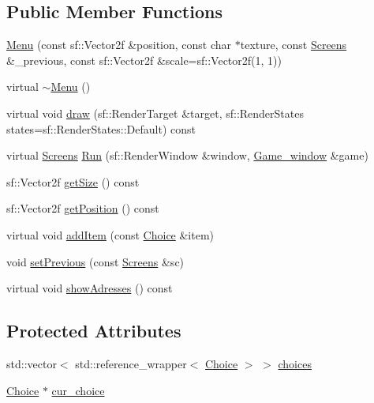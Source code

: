 \subsection*{Public Member Functions}
\begin{DoxyCompactItemize}
\item 
\hyperlink{class_menu_a0e8556179fdcc650e7f3aa58b05f9f4f}{Menu} (const sf\+::\+Vector2f \&position, const char $\ast$texture, const \hyperlink{_globals_8h_a3d5776bab98402b03be09156bacf4f68}{Screens} \&\+\_\+previous, const sf\+::\+Vector2f \&scale=sf\+::\+Vector2f(1, 1))
\item 
virtual \hyperlink{class_menu_a831387f51358cfb88cd018e1777bc980}{$\sim$\+Menu} ()
\item 
virtual void \hyperlink{class_menu_a7bc75c51f0ae43faeb694b8a0c4c7d16}{draw} (sf\+::\+Render\+Target \&target, sf\+::\+Render\+States states=sf\+::\+Render\+States\+::\+Default) const
\item 
virtual \hyperlink{_globals_8h_a3d5776bab98402b03be09156bacf4f68}{Screens} \hyperlink{class_menu_ab8d843dd1787490b96a1e5c70eed5879}{Run} (sf\+::\+Render\+Window \&window, \hyperlink{class_game__window}{Game\+\_\+window} \&game)
\item 
sf\+::\+Vector2f \hyperlink{class_menu_ad99768326c994acf4fba6d9df60d1bcc}{get\+Size} () const
\item 
sf\+::\+Vector2f \hyperlink{class_menu_a589f53bbd6436b381b5ec92a609d5d66}{get\+Position} () const
\item 
virtual void \hyperlink{class_menu_aa8032782ee75fba5fa17bf7a20635c68}{add\+Item} (const \hyperlink{class_choice}{Choice} \&item)
\item 
void \hyperlink{class_menu_ab2b8f2fc48dfbf397a81e9a1b638f970}{set\+Previous} (const \hyperlink{_globals_8h_a3d5776bab98402b03be09156bacf4f68}{Screens} \&sc)
\item 
virtual void \hyperlink{class_menu_ac4cf83e0769be3a20583668f210d98ef}{show\+Adresses} () const
\end{DoxyCompactItemize}
\subsection*{Protected Attributes}
\begin{DoxyCompactItemize}
\item 
std\+::vector$<$ std\+::reference\+\_\+wrapper$<$ \hyperlink{class_choice}{Choice} $>$ $>$ \hyperlink{class_menu_aa40e2b74e7bdeee960889e083eca15d2}{choices}
\item 
\hyperlink{class_choice}{Choice} $\ast$ \hyperlink{class_menu_a91fc2547256d492def0845bd1ebcfaf8}{cur\+\_\+choice}
\end{DoxyCompactItemize}


